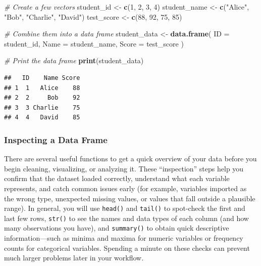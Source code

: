 \documentclass[
  11pt,
]{article}
\newenvironment{Shaded}{\begin{snugshade}}{\end{snugshade}}
\newcommand{\AttributeTok}[1]{\textcolor[rgb]{0.13,0.29,0.53}{#1}}
\newcommand{\CommentTok}[1]{\textcolor[rgb]{0.56,0.35,0.01}{\textit{#1}}}
\newcommand{\DecValTok}[1]{\textcolor[rgb]{0.00,0.00,0.81}{#1}}
\newcommand{\FunctionTok}[1]{\textcolor[rgb]{0.13,0.29,0.53}{\textbf{#1}}}
\newcommand{\NormalTok}[1]{#1}
\newcommand{\OtherTok}[1]{\textcolor[rgb]{0.56,0.35,0.01}{#1}}
\newcommand{\StringTok}[1]{\textcolor[rgb]{0.31,0.60,0.02}{#1}}
\begin{document}
\begin{Shaded}
\begin{Highlighting}[]
\CommentTok{\# Create a few vectors}
\NormalTok{student\_id }\OtherTok{\textless{}{-}} \FunctionTok{c}\NormalTok{(}\DecValTok{1}\NormalTok{, }\DecValTok{2}\NormalTok{, }\DecValTok{3}\NormalTok{, }\DecValTok{4}\NormalTok{)}
\NormalTok{student\_name }\OtherTok{\textless{}{-}} \FunctionTok{c}\NormalTok{(}\StringTok{"Alice"}\NormalTok{, }\StringTok{"Bob"}\NormalTok{, }\StringTok{"Charlie"}\NormalTok{, }\StringTok{"David"}\NormalTok{)}
\NormalTok{test\_score }\OtherTok{\textless{}{-}} \FunctionTok{c}\NormalTok{(}\DecValTok{88}\NormalTok{, }\DecValTok{92}\NormalTok{, }\DecValTok{75}\NormalTok{, }\DecValTok{85}\NormalTok{)}

\CommentTok{\# Combine them into a data frame}
\NormalTok{student\_data }\OtherTok{\textless{}{-}} \FunctionTok{data.frame}\NormalTok{(}
  \AttributeTok{ID =}\NormalTok{ student\_id,}
  \AttributeTok{Name =}\NormalTok{ student\_name,}
  \AttributeTok{Score =}\NormalTok{ test\_score}
\NormalTok{)}

\CommentTok{\# Print the data frame}
\FunctionTok{print}\NormalTok{(student\_data)}
\end{Highlighting}
\end{Shaded}

\begin{verbatim}
##   ID    Name Score
## 1  1   Alice    88
## 2  2     Bob    92
## 3  3 Charlie    75
## 4  4   David    85
\end{verbatim}

\subsubsection{Inspecting a Data Frame}\label{inspecting-a-data-frame}

There are several useful functions to get a quick overview of your data
before you begin cleaning, visualizing, or analyzing it. These
``inspection'' steps help you confirm that the dataset loaded correctly,
understand what each variable represents, and catch common issues early
(for example, variables imported as the wrong type, unexpected missing
values, or values that fall outside a plausible range). In general, you
will use \texttt{head()} and \texttt{tail()} to spot-check the first and
last few rows, \texttt{str()} to see the names and data types of each
column (and how many observations you have), and \texttt{summary()} to
obtain quick descriptive information---such as minima and maxima for
numeric variables or frequency counts for categorical variables.
Spending a minute on these checks can prevent much larger problems later
in your workflow.
\end{document}
